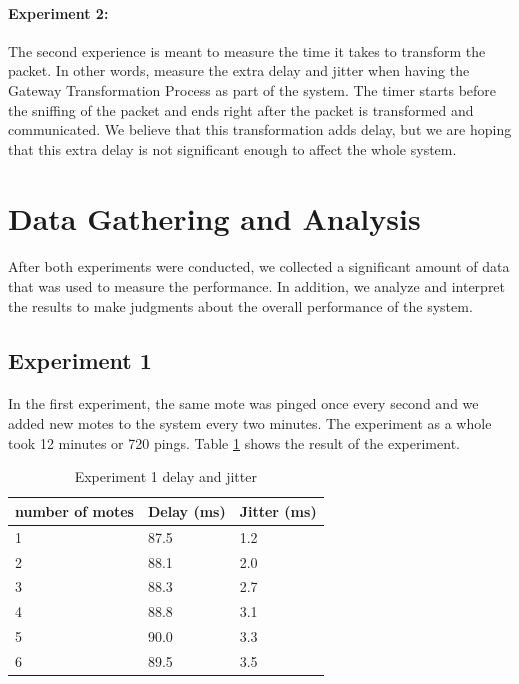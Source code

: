 \documentclass[oneside,12pt,a4paper,final]{book}
\begin{document}
\paragraph{Experiment 2: }
The second experience is meant to measure the time it takes to transform the packet. In other words, measure the extra delay and jitter when having the Gateway Transformation Process as part of the system. The timer starts before the sniffing of the packet and ends right after the packet is transformed and communicated.
We believe that this transformation adds delay, but we are hoping that this extra delay is not significant enough to affect the whole system.
\section{Data Gathering and Analysis}
\paragraph{}
After both experiments were conducted, we collected a significant amount of data that was used to measure the performance. In addition, we analyze and interpret the results to make judgments about the overall performance of the system.
\subsection{Experiment 1}
\paragraph{}
In the first experiment, the same mote was pinged once every second and we added new motes to the system every two minutes. The experiment as a whole took 12 minutes or 720 pings. Table \ref{table:exp1} shows the result of the experiment.

\begin{table}[htbp]
    \begin{tabular}{lll}
    \hline
    number of motes & Delay (ms) & Jitter (ms) \\\hline
    1               & 87.5         & 1.2         \\ 
    2               & 88.1         & 2.0         \\
    3               & 88.3        & 2.7         \\
    4               & 88.8         & 3.1         \\
    5               & 90.0         & 3.3         \\
    6               & 89.5         & 3.5         \\
    \end{tabular}
    \caption{Experiment 1 delay and jitter}
    \label{table:exp1}
\end{table}
\end{document}
